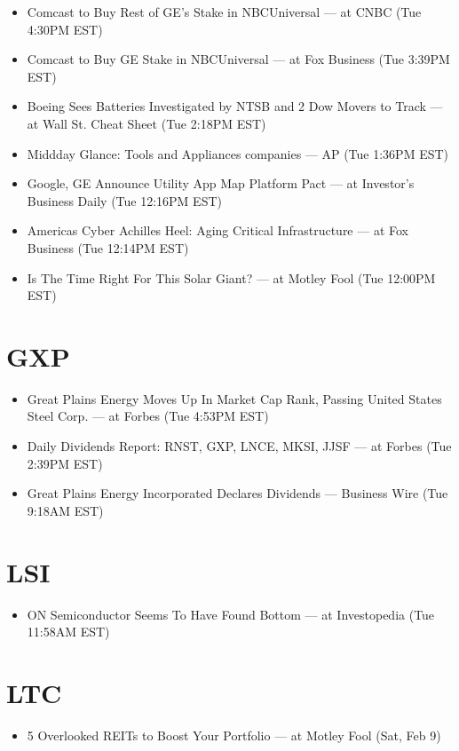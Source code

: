 \documentclass[11pt,asymmetric]{article}
\begin{document}
\begin{itemize}
\item Comcast to Buy Rest of GE's Stake in NBCUniversal --- at CNBC (Tue 4:30PM EST)
\item Comcast to Buy GE Stake in NBCUniversal --- at Fox Business (Tue 3:39PM EST)
\item Boeing Sees Batteries Investigated by NTSB and 2 Dow Movers to Track --- at Wall St. Cheat Sheet (Tue 2:18PM EST)
\item Middday Glance: Tools and Appliances companies --- AP (Tue 1:36PM EST)
\item Google, GE Announce Utility App Map Platform Pact --- at Investor's Business Daily (Tue 12:16PM EST)
\item Americas Cyber Achilles Heel: Aging Critical Infrastructure --- at Fox Business (Tue 12:14PM EST)
\item Is The Time Right For This Solar Giant? --- at Motley Fool (Tue 12:00PM EST)
\end{itemize}

\section*{GXP}
\begin{itemize}
\item Great Plains Energy Moves Up In Market Cap Rank, Passing United States Steel Corp. --- at Forbes (Tue 4:53PM EST)
\item Daily Dividends Report: RNST, GXP, LNCE, MKSI, JJSF --- at Forbes (Tue 2:39PM EST)
\item Great Plains Energy Incorporated Declares Dividends --- Business Wire (Tue 9:18AM EST)
\end{itemize}

\section*{LSI}
\begin{itemize}
\item ON Semiconductor Seems To Have Found Bottom --- at Investopedia (Tue 11:58AM EST)
\end{itemize}

\section*{LTC}
\begin{itemize}
\item 5 Overlooked REITs to Boost Your Portfolio --- at Motley Fool (Sat, Feb 9)
\end{itemize}
\end{document}
